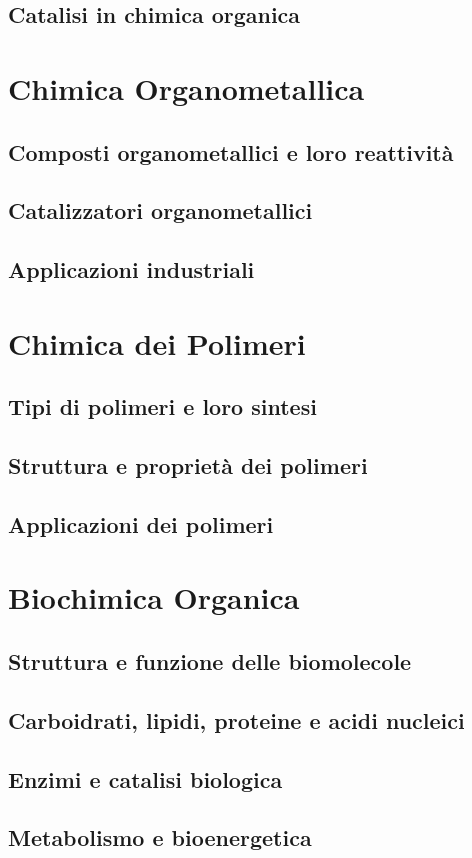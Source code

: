 \subsection{Catalisi in chimica organica}

\section{Chimica Organometallica}
\subsection{Composti organometallici e loro reattività}
\subsection{Catalizzatori organometallici}
\subsection{Applicazioni industriali}

\section{Chimica dei Polimeri}
\subsection{Tipi di polimeri e loro sintesi}
\subsection{Struttura e proprietà dei polimeri}
\subsection{Applicazioni dei polimeri}

\section{Biochimica Organica}
\subsection{Struttura e funzione delle biomolecole}
\subsection{Carboidrati, lipidi, proteine e acidi nucleici}
\subsection{Enzimi e catalisi biologica}
\subsection{Metabolismo e bioenergetica}